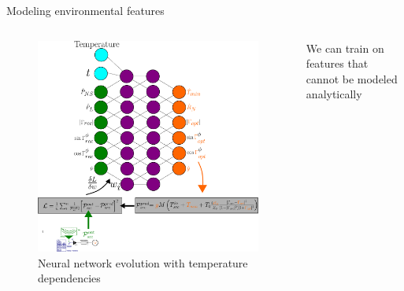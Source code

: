 \documentclass[aspectratio=169]{beamer}
\begin{document}
\begin{frame}{\small{Modeling environmental features}}
	\begin{columns}[c]
		\begin{column}{0.55\textwidth}
			\begin{figure}
				\centering
				\includegraphics[width=\textwidth]{images/nn_time_tpm.pdf}
				\caption{\tiny Neural network evolution with temperature dependencies}
			\end{figure}
		\end{column}
		\begin{column}{0.45\textwidth}
			\begin{tcolorbox}[colback=blue!5!white,colframe=blue!75!black,title=]
				We can train on features that cannot be modeled analytically
			\end{tcolorbox}
		\end{column}
	\end{columns}
\end{frame}
\end{document}
